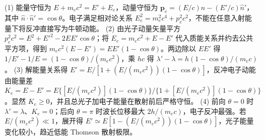 (1) 能量守恒为 \(E+m_ec^2=E'+E_e\)，动量守恒为 \(\boldsymbol p_e=(E/c)\hat n-(E'/c)\hat n'\)，其中 \(\hat n\cdot\hat n'=\cos\theta\)。电子满足相对论关系 \(E_e^2=m_e^2c^4+p_e^2c^2\)，不能在任意入射能量下将反冲直接写为牛顿动能。
(2) 由光子动量矢量平方 \(p_e^2c^2=E^2+E'^2-2EE'\cos\theta\)；将 \(E_e=m_ec^2+E-E'\) 代入质能关系并约去公共平方项，得到 \(m_ec^2(E-E')=EE'(1-\cos\theta)\)。两边除以 \(EE'\) 得 \(1/E'-1/E=(1-\cos\theta)/(m_ec^2)\)，乘 \(hc\) 得 \(\lambda'-\lambda=h(1-\cos\theta)/(m_ec)\)。
(3) 解能量关系得 \(E'=E/[1+(E/(m_ec^2))(1-\cos\theta)]\)，反冲电子动能由能量差 \(K_e=E-E'=E\{[E/(m_ec^2)](1-\cos\theta)\}/\{1+[E/(m_ec^2)](1-\cos\theta)\}\)。显然 \(K_e\ge0\)，并且总光子加电子能量在散射前后严格守恒。
(4) 前向 \(\theta=0\) 时 \(\lambda'=\lambda\)、\(K_e=0\)；后向 \(\theta=\pi\) 时波长位移最大 \(2h/(m_ec)\)，电子反冲最强。若 \(E/(m_ec^2)\ll1\)，展开得 \(E'\simeq E[1-(E/(m_ec^2))(1-\cos\theta)]\)，光子能量变化较小，趋近低能 Thomson 散射极限。
